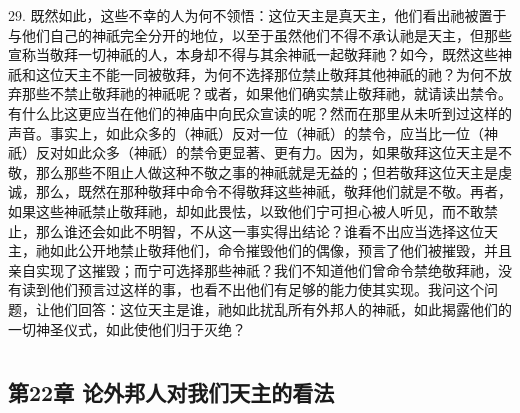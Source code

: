 29. 既然如此，这些不幸的人为何不领悟：这位天主是真天主，他们看出祂被置于与他们自己的神祇完全分开的地位，以至于虽然他们不得不承认祂是天主，但那些宣称当敬拜一切神祇的人，本身却不得与其余神祇一起敬拜祂？如今，既然这些神祇和这位天主不能一同被敬拜，为何不选择那位禁止敬拜其他神祇的祂？为何不放弃那些不禁止敬拜祂的神祇呢？或者，如果他们确实禁止敬拜祂，就请读出禁令。有什么比这更应当在他们的神庙中向民众宣读的呢？然而在那里从未听到过这样的声音。事实上，如此众多的（神祇）反对一位（神祇）的禁令，应当比一位（神祇）反对如此众多（神祇）的禁令更显著、更有力。因为，如果敬拜这位天主是不敬，那么那些不阻止人做这种不敬之事的神祇就是无益的；但若敬拜这位天主是虔诚，那么，既然在那种敬拜中命令不得敬拜这些神祇，敬拜他们就是不敬。再者，如果这些神祇禁止敬拜祂，却如此畏怯，以致他们宁可担心被人听见，而不敢禁止，那么谁还会如此不明智，不从这一事实得出结论？谁看不出应当选择这位天主，祂如此公开地禁止敬拜他们，命令摧毁他们的偶像，预言了他们被摧毁，并且亲自实现了这摧毁；而宁可选择那些神祇？我们不知道他们曾命令禁绝敬拜祂，没有读到他们预言过这样的事，也看不出他们有足够的能力使其实现。我问这个问题，让他们回答：这位天主是谁，祂如此扰乱所有外邦人的神祇，如此揭露他们的一切神圣仪式，如此使他们归于灭绝？\par



\section{}


\subsection{第22章 论外邦人对我们天主的看法}

